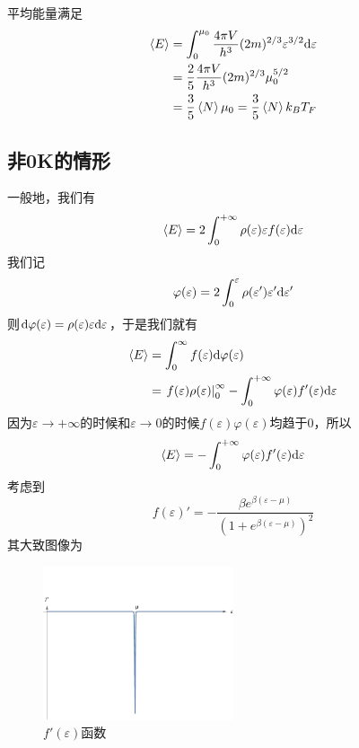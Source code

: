 平均能量满足\begin{equation}
    \begin{aligned}
        \braket{E} &= \int_0^{\mu_0} \frac{4\pi V}{h^3} (2m)^{2/3} \varepsilon^{3/2} \mathrm{d} \varepsilon\\
        &=\frac{2}{5} \frac{4\pi V}{h^3} (2m)^{2/3} \mu_0^{5/2}\\
        &=\frac{3}{5} \braket{N}\mu_0 =\frac{3}{5} \braket{N} k_B T_F
    \end{aligned}
\end{equation}
\subsection{非0K的情形} %
\label{sub:非0K的情形}
一般地，我们有\begin{equation}
    \braket{E}= 2\int_{0}^{+\infty} \rho(\varepsilon) \varepsilon f(\varepsilon)
    \mathrm{d} \varepsilon 
\end{equation}
我们记\begin{equation}
    \varphi(\varepsilon) =2\int_0^\varepsilon \rho(\varepsilon') \varepsilon' \mathrm{d} \varepsilon'
\end{equation}
则$\displaystyle \mathrm{d} \varphi(\varepsilon) =\rho(\varepsilon) \varepsilon \mathrm{d} \varepsilon$，于是我们就有
\begin{equation}
    \begin{aligned}
        \braket{E}& =\int_0^\infty f(\varepsilon) \mathrm{d} \varphi(\varepsilon)\\
        &=\left. f(\varepsilon) \rho(\varepsilon) \right|_0^\infty -\int_{0}^{+\infty}\varphi(\varepsilon)f'(\varepsilon) \mathrm{d}\varepsilon
    \end{aligned}
\end{equation}
因为$\varepsilon\to+\infty$的时候和$\varepsilon\to 0$的时候$f(\varepsilon)\varphi(\varepsilon)$均趋于0，所以\begin{equation}
    \braket{E} = -\int_{0}^{+\infty}\varphi(\varepsilon)f'(\varepsilon) \mathrm{d}\varepsilon
\end{equation}
考虑到\begin{equation}
    f(\varepsilon)'=-\frac{\beta e^{\beta(\varepsilon-\mu)}}{(1+e^{\beta(\varepsilon-\mu)})^2}
\end{equation}
其大致图像为
\begin{figure}[h]
       \centering
       \includegraphics[width=0.5\textwidth]{fig/fermiD.pdf}
       \caption{$f'(\varepsilon)$函数}
       \label{fig:Dfermidistribution}
\end{figure}

